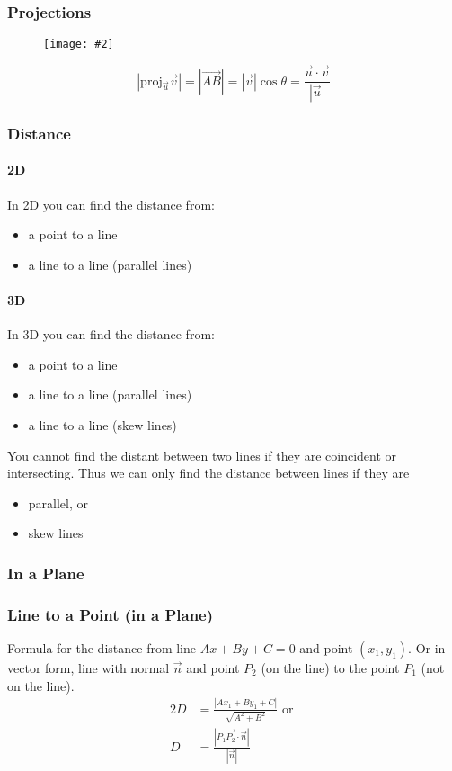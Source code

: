 \documentclass{report}
\newcommand{\diagram}[2][0.5]{
	\begin{figure}[H]
		\centering
		\texttt{[image: \#2]}
	\end{figure}
	}
\theoremstyle{definition}
\numberwithin{equation}{section}
\begin{document}
\subsubsection{Projections}
\diagram{projection}
\begin{equation}
	|\mathrm{proj}_{\vec u} \vec v | = |\overrightarrow{AB}| = |\vec v| \cos \theta = \frac{\vec u \cdot \vec v}{|\vec u|}
\end{equation}

\subsubsection{Distance}
\paragraph{2D}
In 2D you can find the distance from:
\begin{itemize}
	\item a point to a line
	\item a line to a line (parallel lines)
\end{itemize}

\paragraph{3D}
In 3D you can find the distance from:
\begin{itemize}
	\item a point to a line
	\item a line to a line (parallel lines)
	\item a line to a line (skew lines)
\end{itemize}

\bigskip \noindent
You cannot find the distant between two lines if they are coincident or intersecting. Thus we can only find the distance between lines if they are
\begin{itemize}
	\item parallel, or
	\item skew lines
\end{itemize}

\subsubsection{In a Plane}
\subsubsection*{Line to a Point (in a Plane)}
Formula for the distance from line $Ax + By + C = 0$ and point $(x_1,y_1)$. Or in vector form, line with normal $\vec n$ and point $P_2$ (on the line) to the point $P_1$ (not on the line).
\begin{alignat}{2}{}
	D &= \frac{|Ax_1+By_1+C|}{\sqrt{A^2+B^2}} \textrm{ or } \\
	D &= \frac{|\overrightarrow{P_1P_2} \cdot \vec n |}{|\vec n|}
\end{alignat}
\end{document}
